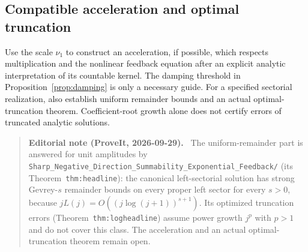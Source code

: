 \documentclass[11pt,a4paper]{article}
\numberwithin{equation}{section}
\theoremstyle{definition}
\theoremstyle{remark}
\newenvironment{ednote}{\par\smallskip\begin{quote}\small\raggedright\textbf{Editorial note (ProveIt, 2026-09-29).}\ }{\end{quote}\smallskip}
\begin{document}
\subsection{Compatible acceleration and optimal truncation}
Use the scale $\nu_1$ to construct an acceleration, if possible, which
respects multiplication and the nonlinear feedback equation after an
explicit analytic interpretation of its countable kernel. The damping
threshold in Proposition~\ref{prop:damping} is only a necessary guide.
For a specified sectorial realization, also establish uniform remainder
bounds and an actual optimal-truncation theorem. Coefficient-root growth
alone does not certify errors of truncated analytic solutions.
\begin{ednote}
The uniform-remainder part is answered for unit amplitudes by
\nolinkurl{Sharp_Negative_Direction_Summability_Exponential_Feedback/}
(its Theorem~\texttt{thm:headline}): the canonical left-sectorial solution has
strong Gevrey-$s$ remainder bounds on every proper left sector for every
$s>0$, because $jL(j)=O((j\log(j+1))^{s+1})$. Its optimized truncation
errors (Theorem~\texttt{thm:logheadline}) assume power growth $j^p$ with $p>1$ and
do not cover this class. The acceleration and an actual optimal-truncation
theorem remain open.
\end{ednote}
\end{document}
